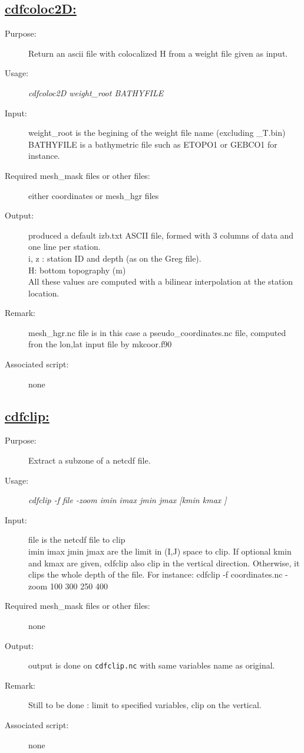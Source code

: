 \documentclass[a4paper,11pt]{article}
\begin{document}
\subsection*{\underline{cdfcoloc2D:}}
\begin{description}
\item[Purpose:] Return an ascii file with colocalized H from a weight file given as input.
\item[Usage:] {\em cdfcoloc2D weight\_root BATHYFILE } 
\item[Input:] weight\_root is the begining of the weight file name (excluding \_T.bin) \\
      BATHYFILE is a bathymetric file such as ETOPO1 or GEBCO1 for instance.
\item[Required mesh\_mask files or other files:] either coordinates or mesh\_hgr files
\item[Output:] produced a default izb.txt ASCII file, formed with 3 columns of data and one line per station. \\
          i, z : station ID and depth (as on the Greg file). \\
          H: bottom topography (m) \\
         All these values are computed with a bilinear interpolation at the station location.
\item[Remark:] mesh\_hgr.nc file is in this case a pseudo\_coordinates.nc file, computed fron the lon,lat input file by mkcoor.f90
\item[Associated script:] none
\end{description}


\newpage
\subsection*{\underline{cdfclip:}}
\begin{description}
\item[Purpose:] Extract a subzone of a netcdf file.
\item[Usage:] {\em cdfclip -f file -zoom imin imax jmin jmax [kmin kmax ]}
\item[Input:] file is the netcdf file to clip \\
      imin imax jmin jmax are the limit in (I,J) space to clip. If optional kmin and kmax are given, cdfclip also
   clip in the vertical direction. Otherwise, it clips the whole depth of the file.
For instance: cdfclip   -f coordinates.nc -zoom 100 300 250 400  
\item[Required mesh\_mask files or other files:] none
\item[Output:] output is done on  {\tt cdfclip.nc} with same variables name as original.
\item[Remark:] Still to be done : limit to specified variables, clip on the vertical.
\item[Associated script:] none
\end{description}
\end{document}
